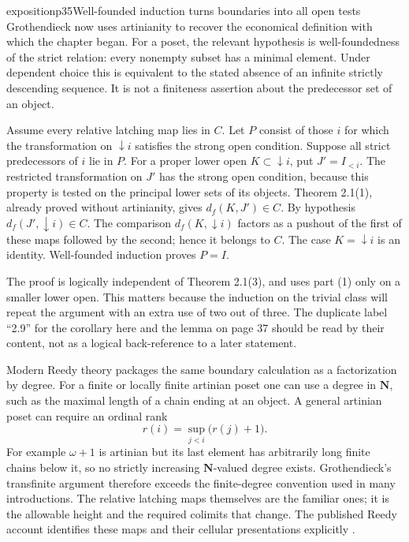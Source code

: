 \begin{dcomment}{exposition}{p35}{Well-founded induction turns boundaries into all open tests}
Grothendieck now uses artinianity to recover the economical definition with which the chapter began. For a poset, the relevant hypothesis is well-foundedness of the strict relation: every nonempty subset has a minimal element. Under dependent choice this is equivalent to the stated absence of an infinite strictly descending sequence. It is not a finiteness assertion about the predecessor set of an object.

Assume every relative latching map lies in $C$. Let $P$ consist of those $i$ for which the transformation on $\downarrow i$ satisfies the strong open condition. Suppose all strict predecessors of $i$ lie in $P$. For a proper lower open $K\subset\downarrow i$, put $J'=I_{<i}$. The restricted transformation on $J'$ has the strong open condition, because this property is tested on the principal lower sets of its objects. Theorem 2.1(1), already proved without artinianity, gives $d_f(K,J')\in C$. By hypothesis $d_f(J',\downarrow i)\in C$. The comparison $d_f(K,\downarrow i)$ factors as a pushout of the first of these maps followed by the second; hence it belongs to $C$. The case $K=\downarrow i$ is an identity. Well-founded induction proves $P=I$.

The proof is logically independent of Theorem 2.1(3), and uses part (1) only on a smaller lower open. This matters because the induction on the trivial class will repeat the argument with an extra use of two out of three. The duplicate label ``2.9'' for the corollary here and the lemma on page 37 should be read by their content, not as a logical back-reference to a later statement.

Modern Reedy theory packages the same boundary calculation as a factorization by degree. For a finite or locally finite artinian poset one can use a degree in $\mathbf N$, such as the maximal length of a chain ending at an object. A general artinian poset can require an ordinal rank
\[
 r(i)=\sup_{j<i}\bigl(r(j)+1\bigr).
\]
For example $\omega+1$ is artinian but its last element has arbitrarily long finite chains below it, so no strictly increasing $\mathbf N$-valued degree exists. Grothendieck's transfinite argument therefore exceeds the finite-degree convention used in many introductions. The relative latching maps themselves are the familiar ones; it is the allowable height and the required colimits that change. The published Reedy account identifies these maps and their cellular presentations explicitly \citep[Definition 4.14 and Proposition 6.3]{RiehlVerity2014Reedy}.
\end{dcomment}

